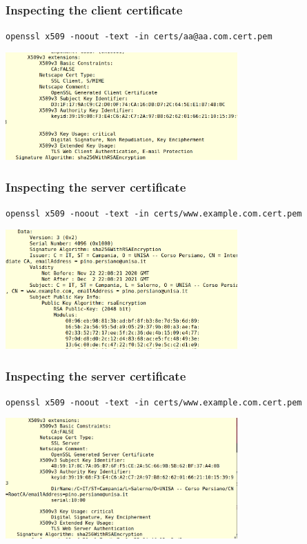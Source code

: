 \documentclass[]{beamer}
\begin{document}
\begin{frame}
\frametitle{Inspecting the client certificate}

\centerline{\color{magenta} \tt openssl x509 -noout -text -in certs/aa@aa.com.cert.pem}

\begin{center}
\includegraphics[width=3.5in]{imgs/clientCert2.png}
\end{center}
\end{frame}

\begin{frame}
\frametitle{Inspecting the server certificate}

\centerline{\color{magenta} \tt openssl x509 -noout -text -in certs/www.example.com.cert.pem}

\begin{center}
\includegraphics[width=3.5in]{imgs/serverCert.png}
\end{center}
\end{frame}

\begin{frame}
\frametitle{Inspecting the server certificate}

\centerline{\color{magenta} \tt openssl x509 -noout -text -in certs/www.example.com.cert.pem}


\begin{center}
\includegraphics[width=3.5in]{imgs/serverCert2.png}
\end{center}
\end{frame}
\end{document}
